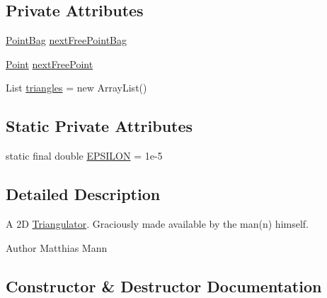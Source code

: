 \subsection*{Private Attributes}
\begin{DoxyCompactItemize}
\item 
\mbox{\hyperlink{classorg_1_1newdawn_1_1slick_1_1geom_1_1_mann_triangulator_1_1_point_bag}{Point\+Bag}} \mbox{\hyperlink{classorg_1_1newdawn_1_1slick_1_1geom_1_1_mann_triangulator_a4ffb313293a8dcbbed43a28005e225bb}{next\+Free\+Point\+Bag}}
\item 
\mbox{\hyperlink{classorg_1_1newdawn_1_1slick_1_1geom_1_1_mann_triangulator_1_1_point}{Point}} \mbox{\hyperlink{classorg_1_1newdawn_1_1slick_1_1geom_1_1_mann_triangulator_a118a96eab8295cfebe18ec95b0236640}{next\+Free\+Point}}
\item 
List \mbox{\hyperlink{classorg_1_1newdawn_1_1slick_1_1geom_1_1_mann_triangulator_ad0c6e5e26a0a15154513f0225f156c7a}{triangles}} = new Array\+List()
\end{DoxyCompactItemize}
\subsection*{Static Private Attributes}
\begin{DoxyCompactItemize}
\item 
static final double \mbox{\hyperlink{classorg_1_1newdawn_1_1slick_1_1geom_1_1_mann_triangulator_a78771c6d0430b774acac9eee87d0886a}{E\+P\+S\+I\+L\+ON}} = 1e-\/5
\end{DoxyCompactItemize}


\subsection{Detailed Description}
A 2D \mbox{\hyperlink{interfaceorg_1_1newdawn_1_1slick_1_1geom_1_1_triangulator}{Triangulator}}. Graciously made available by the man(n) himself.

\begin{DoxyAuthor}{Author}
Matthias Mann 
\end{DoxyAuthor}


\subsection{Constructor \& Destructor Documentation}
\mbox{\label{classorg_1_1newdawn_1_1slick_1_1geom_1_1_mann_triangulator_a9581206bc78d27104475b8fba8004fb2}} 
